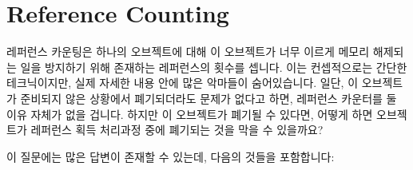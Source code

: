 
\section{Reference Counting}
\label{sec:defer:Reference Counting}

레퍼런스 카운팅은 하나의 오브젝트에 대해 이 오브젝트가 너무 이르게 메모리
해제되는 일을 방지하기 위해 존재하는 레퍼런스의 횟수를 셉니다.
이는 컨셉적으로는 간단한 테크닉이지만, 실제 자세한 내용 안에 많은 악마들이
숨어있습니다.
일단, 이 오브젝트가 준비되지 않은 상황에서 폐기되더라도 문제가 없다고 하면,
레퍼런스 카운터를 둘 이유 자체가 없을 겁니다.
하지만 이 오브젝트가 폐기될 수 있다면, 어떻게 하면 오브젝트가 레퍼런스 획득
처리과정 중에 폐기되는 것을 막을 수 있을까요?

이 질문에는 많은 답변이 존재할 수 있는데, 다음의 것들을 포함합니다:
\iffalse

Reference counting tracks the number of references
to a given object in order to prevent that object from being prematurely
freed.
Although this is a conceptually simple technique, many devils hide in
the details.
After all, if the object was not subject to premature disposal,
there would be no need for the reference counter in the first place.
But if the object can be disposed of, what prevents disposal during
the reference-acquisition process itself?

There are a number of possible answers to this question, including:
\fi

